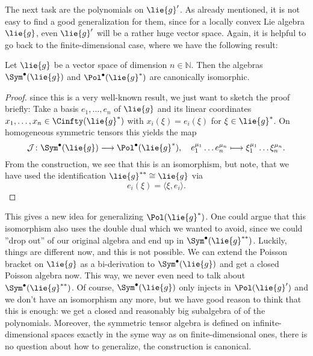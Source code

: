 The next task are the polynomials on $\lie{g}'$. As already mentioned, it is 
not easy to find a good generalization for them, since for a locally convex 
Lie algebra $\lie{g}$, even $\lie{g}'$ will be a rather huge vector space. 
Again, it is helpful to go back to the finite-dimensional case, where we have 
the following result:
\begin{proposition}
	\label{Alg:Prop:PolIsSym}
	Let $\lie{g}$ be a vector space of dimension $n \in \mathbb{N}$. Then 
	the algebras $\Sym^{\bullet}(\lie{g})$ and $\Pol^{\bullet}(\lie{g}^*)$ 
	are canonically isomorphic.
\end{proposition}
\begin{proof}
	since this is a very well-known result, we just want to sketch the proof 
	briefly: Take a basis $e_1, \ldots, e_n$ of $\lie{g}$ and its linear 
	coordinates $x_1, \ldots, x_n \in \Cinfty(\lie{g}^*)$ with $x_i(\xi) = 
	e_i(\xi)$ for $\xi \in \lie{g}^*$. On homogeneous symmetric tensors this 
	yields the map
	\begin{equation*}
		\mathcal{J}
		\colon
		\Sym^{\bullet}(\lie{g})
		\longrightarrow
		\Pol^{\bullet}(\lie{g}^*),
		\quad
		e_1^{\mu_1} \ldots e_n^{\mu_n}
		\longmapsto
		\xi_1^{\mu_1} \ldots \xi_n^{\mu_n}.
	\end{equation*}
	From the construction, we see that this is an isomorphism, but note, that 
	we have used the identification $\lie{g}^{**} \cong \lie{g}$ via
	\begin{equation*}
		e_i(\xi)
		=
		\langle \xi, e_i \rangle.
	\end{equation*}
\end{proof}
This gives a new idea for generalizing $\Pol(\lie{g}^*)$. One could argue that 
this isomorphism also uses the double dual which we wanted to avoid, since we 
could ''drop out'' of our original algebra and end up in $\Sym^{\bullet}
(\lie{g}^{**})$. Luckily, things are different now, and this is not possible. 
We can extend the Poisson bracket on $\lie{g}$ as a bi-derivation to 
$\Sym^{\bullet}(\lie{g})$ and get a closed Poisson algebra now. This way, we 
never even need to talk about $\Sym^{\bullet}(\lie{g}^{**})$. Of course, 
$\Sym^{\bullet}(\lie{g})$ only injects in $\Pol(\lie{g}')$ and we don't have 
an isomorphism any more, but we have good reason to think that this is enough: 
we get a closed and reasonably big subalgebra of of the polynomials. Moreover, 
the symmetric tensor algebra is defined on infinite-dimensional spaces 
exactly in the syme way as on finite-dimensional ones, there is no question 
about how to generalize, the construction is canonical.


